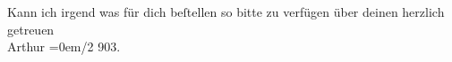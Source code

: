 \begin{ledgroupsized}[t]{13cm}
           \pstart
           {\pb}Kann ich irgend was für dich beſtellen so bitte zu
               verfügen über deinen\pend
           \pstart
           herzlich getreuen{\\[\baselineskip]}\spacefill\mbox{Arthur}\pend
           \leftskip=0em{}/2 903.\pend
           \endnumbering{}\end{ledgroupsized}  \newcommand{\dateiname}{L01270}\newcommand{\titel}{Arthur Schnitzler an Hermann Bahr, 20. 2. 1903}\newcommand{\editorInnen}{ Kurt Ifkovits,  Martin Anton Müller}
      
